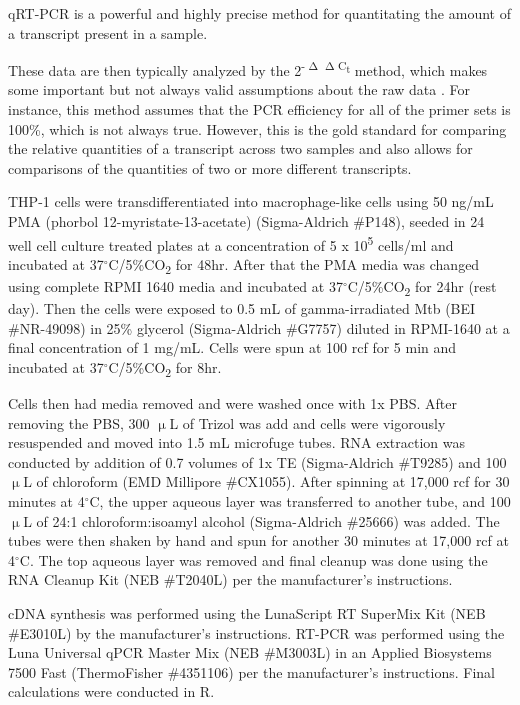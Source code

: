 \citep{Dvinge2009, Perkins2012, Pabinger2014}

qRT-PCR is a powerful and highly precise method for quantitating the amount of a transcript present in a sample. 

These data are then typically analyzed by the 2\textsuperscript{-$\upDelta\upDelta$C\textsubscript{t}} method, which makes some important but not always valid assumptions about the raw data \citep{Livak2001}. For instance, this method assumes that the PCR efficiency for all of the primer sets is 100\%, which is not always true. However, this is the gold standard for comparing the relative quantities of a transcript across two samples and also allows for comparisons of the quantities of two or more different transcripts. 

THP-1 cells were transdifferentiated into macrophage-like cells using 50 ng/mL PMA (phorbol 12-myristate-13-acetate) (Sigma-Aldrich \#P148), seeded in 24 well cell culture treated plates at a concentration of 5 x 10\textsuperscript{5} cells/ml and incubated at 37$^{\circ}$C/5\%CO\textsubscript{2} for 48hr. After that the PMA media was changed using complete RPMI 1640 media and incubated at 37$^{\circ}$C/5\%CO\textsubscript{2} for 24hr (rest day). Then the cells were exposed to 0.5 mL of gamma-irradiated Mtb (BEI \#NR-49098) in 25\% glycerol (Sigma-Aldrich \#G7757) diluted in RPMI-1640 at a final concentration of 1 mg/mL. Cells were spun at 100 rcf for 5 min and incubated at 37$^{\circ}$C/5\%CO\textsubscript{2} for 8hr.

Cells then had media removed and were washed once with 1x PBS. After removing the PBS, 300 $\upmu$L of Trizol was add and cells were vigorously resuspended and moved into 1.5 mL microfuge tubes. RNA extraction was conducted by addition of 0.7 volumes of 1x TE (Sigma-Aldrich \#T9285) and 100 $\upmu$L of chloroform (EMD Millipore \#CX1055). After spinning at 17,000 rcf for 30 minutes at 4$^{\circ}$C, the upper aqueous layer was transferred to another tube, and 100 $\upmu$L of 24:1 chloroform:isoamyl alcohol (Sigma-Aldrich \#25666) was added. The tubes were then shaken by hand and spun for another 30 minutes at 17,000 rcf at 4$^{\circ}$C. The top aqueous layer was removed and final cleanup was done using the RNA Cleanup Kit (NEB \#T2040L) per the manufacturer's instructions.

cDNA synthesis was performed using the LunaScript RT SuperMix Kit (NEB \#E3010L) by the manufacturer's instructions. RT-PCR was performed using the Luna Universal qPCR Master Mix (NEB \#M3003L) in an Applied Biosystems 7500 Fast (ThermoFisher \#4351106) per the manufacturer's instructions. Final calculations were conducted in R. 

